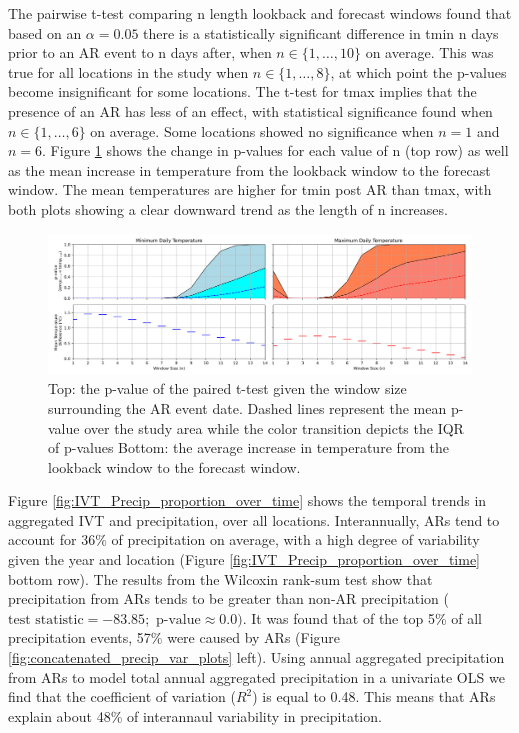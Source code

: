 \documentclass[draft]{AR_analysis_}
\begin{document}
The pairwise t-test comparing n length lookback and forecast windows
found that based on an $\alpha = 0.05$ there is a
statistically significant difference in tmin n days prior to an AR event
to n days after, when $ n \in \{1, \ldots, 10\}$ on average.
This was true for all locations in the study when $ n \in \{1,
\ldots, 8\}$, at which point the p-values become insignificant for some
locations. The t-test for
tmax implies that the presence of an AR has less of an effect, with
statistical significance found when $ n \in \{1, \ldots, 6\}$ on
average. Some locations showed no significance when $n=1$ and $n=6$. Figure
\ref{fig:tmin_vs_tmax_subplots} shows the change in p-values for each
value of n (top row) as well as the mean increase in temperature
from the lookback window to the forecast window. The mean
temperatures are higher for tmin post AR than tmax, with both plots
showing a clear downward trend as the length of n increases.     

\begin{figure}
\centering
\includegraphics[width=1.0\textwidth]{./images/tmin_vs_tmax_subplots.png}
\caption{Top: the p-value of the paired t-test given the
	window size surrounding the AR event date. Dashed lines
	represent the mean p-value over the study area while the color
	transition depicts the IQR of p-values Bottom: the average increase
	in temperature from the lookback window to the forecast window.}
\label{fig:tmin_vs_tmax_subplots} 
\end{figure}

Figure \ref{fig:IVT_Precip_proportion_over_time} shows the temporal
trends in aggregated IVT and precipitation,
over all locations. Interannually, ARs tend to account for 36\% of
precipitation on average, with a high degree of variability given
the year and location (Figure \ref{fig:IVT_Precip_proportion_over_time}
bottom row). The results from the Wilcoxin rank-sum test show that
precipitation from ARs tends to be greater than non-AR precipitation
($\text{test statistic} = -83.85; \text{ p-value} \approx 0.0)$. It
was found that of the top 5\% of all precipitation events, 57\% were
caused by ARs (Figure \ref{fig:concatenated_precip_var_plots} left).
Using annual aggregated precipitation from ARs to model total annual
aggregated precipitation in a univariate OLS we find that the
coefficient of variation ($R^{2}$) is equal to 0.48. This means that ARs
explain about 48\% of interannaul variability in precipitation.  
\end{document}
